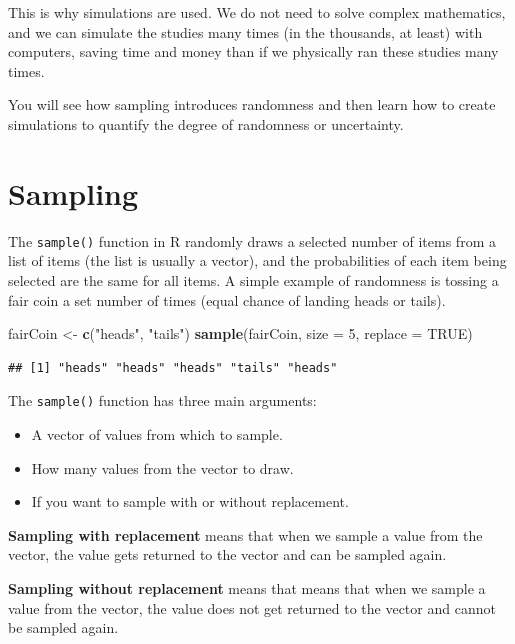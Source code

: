 \documentclass[
]{book}
\newenvironment{Shaded}{\begin{snugshade}}{\end{snugshade}}
\newcommand{\AttributeTok}[1]{\textcolor[rgb]{0.13,0.29,0.53}{#1}}
\newcommand{\ConstantTok}[1]{\textcolor[rgb]{0.56,0.35,0.01}{#1}}
\newcommand{\DecValTok}[1]{\textcolor[rgb]{0.00,0.00,0.81}{#1}}
\newcommand{\FunctionTok}[1]{\textcolor[rgb]{0.13,0.29,0.53}{\textbf{#1}}}
\newcommand{\NormalTok}[1]{#1}
\newcommand{\OtherTok}[1]{\textcolor[rgb]{0.56,0.35,0.01}{#1}}
\newcommand{\StringTok}[1]{\textcolor[rgb]{0.31,0.60,0.02}{#1}}
\providecommand{\tightlist}{%
  \setlength{\itemsep}{0pt}\setlength{\parskip}{0pt}}
\theoremstyle{definition}
\theoremstyle{definition}
\theoremstyle{definition}
\theoremstyle{definition}
\theoremstyle{remark}
\begin{document}
This is why simulations are used. We do not need to solve complex mathematics, and we can simulate the studies many times (in the thousands, at least) with computers, saving time and money than if we physically ran these studies many times.

You will see how sampling introduces randomness and then learn how to create simulations to quantify the degree of randomness or uncertainty.

\hypertarget{sampling}{%
\section{Sampling}\label{sampling}}

The \texttt{sample()} function in R randomly draws a selected number of items from a list of items (the list is usually a vector), and the probabilities of each item being selected are the same for all items. A simple example of randomness is tossing a fair coin a set number of times (equal chance of landing heads or tails).

\begin{Shaded}
\begin{Highlighting}[]
\NormalTok{fairCoin }\OtherTok{\textless{}{-}} \FunctionTok{c}\NormalTok{(}\StringTok{"heads"}\NormalTok{, }\StringTok{"tails"}\NormalTok{)}
\FunctionTok{sample}\NormalTok{(fairCoin, }\AttributeTok{size =} \DecValTok{5}\NormalTok{, }\AttributeTok{replace =} \ConstantTok{TRUE}\NormalTok{)}
\end{Highlighting}
\end{Shaded}

\begin{verbatim}
## [1] "heads" "heads" "heads" "tails" "heads"
\end{verbatim}

The \texttt{sample()} function has three main arguments:

\begin{itemize}
\tightlist
\item
  A vector of values from which to sample.
\item
  How many values from the vector to draw.
\item
  If you want to sample with or without replacement.
\end{itemize}

\textbf{Sampling with replacement} means that when we sample a value from the vector, the value gets returned to the vector and can be sampled again.

\textbf{Sampling without replacement} means that means that when we sample a value from the vector, the value does not get returned to the vector and cannot be sampled again.
\end{document}
